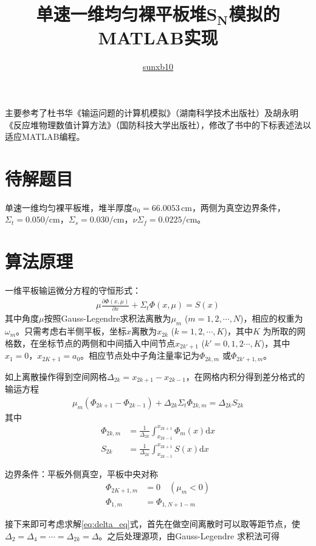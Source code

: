 \documentclass[a4paper,10.5pt]{article}
\title{\heiti 单速一维均匀裸平板堆$\boldsymbol{S_{N}}$模拟的MATLAB实现}
\author{\href{mailto:sunxb10@gmail.com}{sunxb10}}
\date{}
\newcommand\md {\mathrm{d}}
\newcommand \kaiti {\CJKfamily{KaiTi}}
\begin{document}
\maketitle
{\kaiti 主要参考了杜书华《输运问题的计算机模拟》（湖南科学技术出版社）及胡永明《反应堆物理数值计算方法》（国防科技大学出版社），修改了书中的下标表述法以适应MATLAB编程。}\par
\section{待解题目}
单速一维均匀裸平板堆，堆半厚度$a_{0}=66.0053\,\mathrm{cm}$，两侧为真空边界条件，$\Sigma_{t}=0.050/\mathrm{cm}$，$\Sigma_{s}=0.030/\mathrm{cm}$，$\nu\Sigma_{f}=0.0225/\mathrm{cm}$。\par
\section{算法原理}
一维平板输运微分方程的守恒形式：
\begin{align}
\mu\frac{\partial\Phi(x,\mu)}{\partial{}x}+\Sigma_{t}\Phi(x,\mu)=S(x)\label{eq:diff_eq}
\end{align}
其中角度$\mu$按照Gauss-Legendre求积法离散为$\mu_{m}$ ($m=1,2,\cdots,N$)，相应的权重为$\omega_{m}$。只需考虑右半侧平板，坐标$x$离散为$x_{2k}$ ($k=1,2,\cdots,K$)，其中$K$ 为所取的网格数，在坐标节点的两侧和中间插入中间节点$x_{2k'+1}$ ($k'=0,1,2\cdots,K$)，其中$x_{1}=0$，$x_{2K+1}=a_{0}$。相应节点处中子角注量率记为$\Phi_{2k,m}$ 或$\Phi_{2k'+1,m}$。\par
如上离散操作得到空间网格$\Delta_{2k}=x_{2k+1}-x_{2k-1}$，在网格内积分得到差分格式的输运方程
\begin{align}
\mu_{m}(\Phi_{2k+1}-\Phi_{2k-1})+\Delta_{2k}\Sigma_{t}\Phi_{2k,m}=\Delta_{2k}S_{2k}\label{eq:delta_eq}
\end{align}
其中
\begin{align*}
\Phi_{2k,m}&=\frac{1}{\Delta_{2k}}\int_{x_{2k-1}}^{x_{2k+1}}\Phi_{m}(x)\md{}x\\
S_{2k}&=\frac{1}{\Delta_{2k}}\int_{x_{2k-1}}^{x_{2k+1}}S(x)\md{}x
\end{align*}
\par
边界条件：平板外侧真空，平板中央对称
\begin{align}
\Phi_{2K+1,m}&=0\quad(\mu_{m}<0)\label{eq:outer_boundary}\\
\Phi_{1,m}&=\Phi_{1,N+1-m}\label{eq:inner_boundary}
\end{align}
\par
接下来即可考虑求解\eqref{eq:delta_eq}式，首先在做空间离散时可以取等距节点，使$\Delta_{2}=\Delta_{4}=\cdots=\Delta_{2k}=\Delta$。之后处理源项，由Gauss-Legendre 求积法可得
\end{document}
